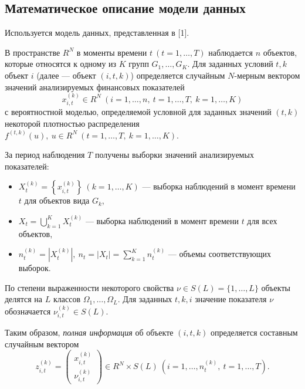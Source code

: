 \documentclass[14pt,a4paper]{extarticle}
\begin{document}
\subsection{Математическое описание модели данных}

Используется модель данных, представленная в [1].

В пространстве $R^{N}$ в моменты времени $t\ (t=1,\ldots,T)$ наблюдается $n$ объектов, которые 
относятся к одному из $K$ групп $G_{1},\ldots,G_{K}$. Для заданных условий $t,k$ объект $i$ 
(далее --- объект $(i,t,k)$) определяется случайным $N$-мерным вектором значений анализируемых финансовых 
показателей
\[
x_{i,t}^{(k)} \in R^{N}\ (i=1,\ldots,n,\ t=1,\ldots,T,\ k=1,\ldots,K)
\]
с вероятностной моделью, определяемой условной для заданных значений $(t,k)$ некоторой плотностью распределения $f^{(t,k)}(u),\ u \in R^{N}\ (t=1,\ldots,T,\ k=1,\ldots,K)$.

За период наблюдения $T$ получены выборки значений анализируемых показателей:
\begin{itemize}
    \item $X_{t}^{(k)} = \left\{ x_{i,t}^{(k)} \right\}\ (k=1,\ldots,K)$ --- выборка наблюдений в момент времени $t$ для объектов вида $G_{k}$,
    \item $X_{t} = \bigcup_{k=1}^{K} X_{t}^{(k)}$ --- выборка наблюдений в момент времени $t$ для всех объектов,
    \item $n_{t}^{(k)} = |X_{t}^{(k)}|,\ n_{t} = |X_{t}| = \sum_{k=1}^{K} n_{t}^{(k)}$ --- объемы соответствующих выборок.
\end{itemize}

По степени выраженности некоторого свойства $\nu \in S(L) = \{1,\ldots,L\}$ объекты делятся на $L$ классов $\Omega_{1},\ldots,\Omega_{L}$. Для заданных $t,k,i$ значение показателя $\nu$ обозначается $\nu_{i,t}^{(k)} \in S(L)$.

Таким образом, \textit{полная информация} об объекте $(i,t,k)$ определяется составным случайным вектором
\begin{equation}
z_{i,t}^{(k)} = \begin{pmatrix}
x_{i,t}^{(k)} \\
\nu_{i,t}^{(k)}
\end{pmatrix} \in R^{N} \times S(L)\ (i=1,\ldots,n_{t}^{(k)},\ t=1,\ldots,T).
\end{equation}
\end{document}
